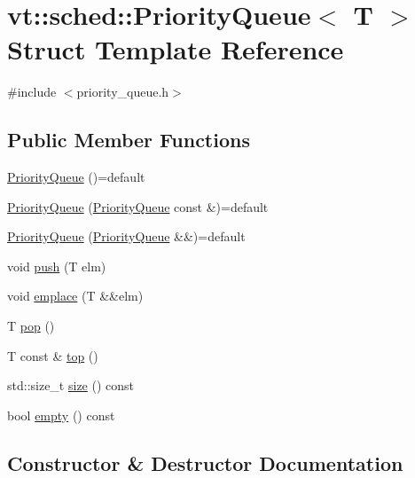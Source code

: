 \hypertarget{structvt_1_1sched_1_1_priority_queue}{}\section{vt\+:\+:sched\+:\+:Priority\+Queue$<$ T $>$ Struct Template Reference}
\label{structvt_1_1sched_1_1_priority_queue}


{\ttfamily \#include $<$priority\+\_\+queue.\+h$>$}

\subsection*{Public Member Functions}
\begin{DoxyCompactItemize}
\item 
\hyperlink{structvt_1_1sched_1_1_priority_queue_a03986418bd682344f22d1e0a5d4a3e3a}{Priority\+Queue} ()=default
\item 
\hyperlink{structvt_1_1sched_1_1_priority_queue_aca0fe178fbd601fa22816c2d895d5435}{Priority\+Queue} (\hyperlink{structvt_1_1sched_1_1_priority_queue}{Priority\+Queue} const \&)=default
\item 
\hyperlink{structvt_1_1sched_1_1_priority_queue_a25eedffc3b4665d0c1bb27027803e571}{Priority\+Queue} (\hyperlink{structvt_1_1sched_1_1_priority_queue}{Priority\+Queue} \&\&)=default
\item 
void \hyperlink{structvt_1_1sched_1_1_priority_queue_af532279184e76da6c72a52664d6a9922}{push} (T elm)
\item 
void \hyperlink{structvt_1_1sched_1_1_priority_queue_a152f4592447d7c478fe6aa0f8fbd5173}{emplace} (T \&\&elm)
\item 
T \hyperlink{structvt_1_1sched_1_1_priority_queue_aec357e1233dcb2991105795640372f8a}{pop} ()
\item 
T const  \& \hyperlink{structvt_1_1sched_1_1_priority_queue_ad5f072e3452ba8b950456bc4b072deb1}{top} ()
\item 
std\+::size\+\_\+t \hyperlink{structvt_1_1sched_1_1_priority_queue_a017313382884e652da648d274a09b80d}{size} () const
\item 
bool \hyperlink{structvt_1_1sched_1_1_priority_queue_aaee204c658c333cd9bb30615bcb35e07}{empty} () const
\end{DoxyCompactItemize}


\subsection{Constructor \& Destructor Documentation}
\mbox{\label{structvt_1_1sched_1_1_priority_queue_a03986418bd682344f22d1e0a5d4a3e3a}} 
